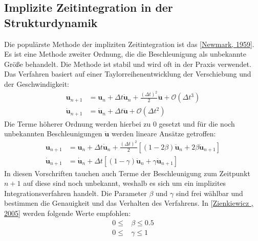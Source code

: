 \documentclass[letterpaper,10pt,german]{jupyterBook}
\begin{document}
\subsection{Implizite Zeitintegration in der Strukturdynamik}
\label{\detokenize{chapters/chapter6/TransienteDynamik:implizite-zeitintegration-in-der-strukturdynamik}}
\sphinxAtStartPar
Die populärste Methode der impliziten Zeitintegration ist das  {[}\hyperlink{cite.quellen:id21}{Newmark, 1959}{]}. Es ist eine Methode zweiter Ordnung, die die Beschleunigung als unbekannte Größe behandelt. Die Methode ist stabil und wird oft in der Praxis verwendet. Das Verfahren basiert auf einer Taylorreihenentwicklung der Verschiebung und der Geschwindigkeit:
\label{equation:chapters/chapter6/TransienteDynamik:9f2ec588-5d47-4bf1-8143-20870abfb9f2}\begin{align}
\bm{u}_{n+1} & = \bm{u}_n + \Delta t \dot{\bm{u}}_n + \frac{(\Delta t)^2}{2} \ddot{\bm{u}} + \mathcal{O}(\Delta t^3) \\
\dot{\bm{u}}_{n+1} & = \dot{\bm{u}}_n + \Delta t \ddot{\bm{u}} + \mathcal{O}(\Delta t^2)
\end{align}
\sphinxAtStartPar
Die Terme höherer Ordnung werden hierbei zu 0 gesetzt und für die noch unbekannten Beschleunigungen \(\ddot{\bm{u}}\) werden lineare Ansätze getroffen:
\label{equation:chapters/chapter6/TransienteDynamik:3f60587c-1a8a-4d77-b55a-a07d90468c76}\begin{align}
\bm{u}_{n+1} & = \bm{u}_n + \Delta t \dot{\bm{u}}_n + \frac{(\Delta t)^2}{2} \left[ (1-2\beta) \ddot{\bm{u}}_n + 2\beta \ddot{\bm{u}}_{n+1} \right] \\
\dot{\bm{u}}_{n+1} & = \dot{\bm{u}}_n + \Delta t \left[(1-\gamma)\ddot{\bm{u}}_{n} + \gamma \ddot{\bm{u}}_{n+1} \right]
\end{align}
\sphinxAtStartPar
In diesen Vorschriften tauchen auch Terme der Beschleunigung zum Zeitpunkt \(n+1\) auf \sphinxhyphen{} diese sind noch unbekannt, weshalb es sich um ein implizites Integrationsverfahren handelt. Die Parameter \(\beta\) und \(\gamma\) sind frei wählbar und bestimmen die Genauigkeit und das Verhalten des Verfahrens. In {[}\hyperlink{cite.quellen:id3}{Zienkiewicz , 2005}{]} werden folgende Werte empfohlen:
\label{equation:chapters/chapter6/TransienteDynamik:49fb9efd-7409-4760-83f1-1a5be9040606}\begin{align}
0 \leq &\beta \leq 0.5\\
0 \leq & \gamma \leq 1
\end{align}
\end{document}
